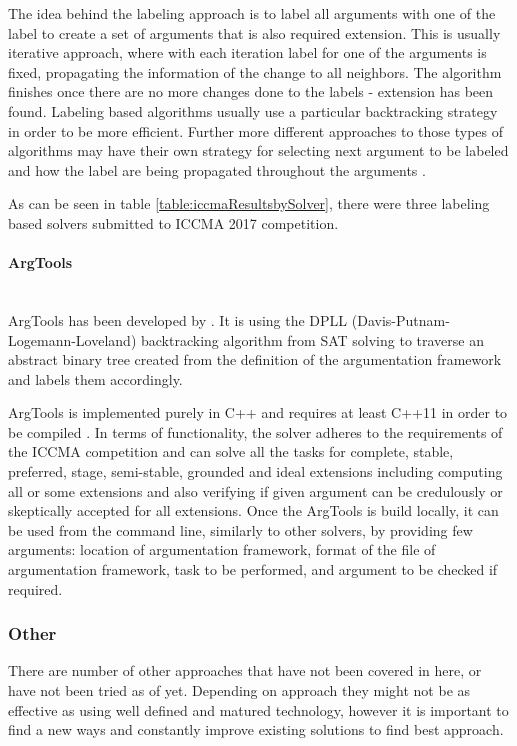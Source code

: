 The idea behind the labeling approach is to label all arguments with one of the label to create a set of arguments that is also required extension. This is usually iterative approach, where with each iteration label for one of the arguments is fixed, propagating the information of the change to all neighbors. The algorithm finishes once there are no more changes done to the labels - extension has been found. Labeling based algorithms usually use a particular backtracking strategy in order to be more efficient. Further more different approaches to those types of algorithms may have their own strategy for selecting next argument to be labeled and how the label are being propagated throughout the arguments \citep{solvingMethods}.

As can be seen in table \ref{table:iccmaResultsbySolver}, there were three labeling based solvers submitted to ICCMA 2017 competition. 

\paragraph{ArgTools}\mbox{} \\
ArgTools has been developed by \citet{argtools}. It is using the DPLL (Davis-Putnam-Logemann-Loveland) backtracking algorithm from SAT solving \citep{bierehandbook} to traverse an abstract binary tree created from the definition of the argumentation framework and labels them accordingly. 
 
ArgTools is implemented purely in C++ and requires at least C++11 in order to be compiled \citep{argtools}. In terms of functionality, the solver adheres to the requirements of the ICCMA competition and can solve all the tasks for complete, stable, preferred, stage, semi-stable, grounded and ideal extensions including computing all or some extensions and also verifying if given argument can be credulously or skeptically accepted for all extensions. Once the ArgTools is build locally, it can be used from the command line, similarly to other solvers, by providing few arguments: location of argumentation framework, format of the file of argumentation framework, task to be performed, and argument to be checked if required. 


\subsubsection{Other}
There are number of other approaches that have not been covered in here, or have not been tried as of yet. Depending on approach they might not be as effective as using well defined and matured technology, however it is important to find a new ways and constantly improve existing solutions to find best approach.